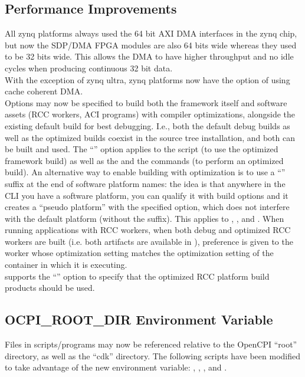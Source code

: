 \subsection{Performance Improvements}
\label{sec:21_perf}
All zynq platforms always used the 64 bit AXI DMA interfaces in the
zynq chip, but now the SDP/DMA FPGA modules are also 64 bits wide
whereas they used to be 32 bits wide.  This allows the DMA to have
higher throughput and no idle cycles when producing continuous 32 bit data.\\

With the exception of zynq ultra, zynq platforms now have the option of using cache coherent DMA.\\

Options may now be specified to build both the framework itself and software assets (RCC workers, ACI programs) with compiler optimizations, alongside the existing default build for best debugging.  I.e., both the default debug builds as well as the optimized builds coexist in the source tree installation, and both can be built and used.  The ``'' option applies to the  script (to use the optimized framework build) as well as the  and the  commands (to perform an optimized build).  An alternative way to enable building with optimization is to use a ``'' suffix at the end of software platform names: the idea is that anywhere in the CLI you have a software platform, you can qualify it with build options and it creates a ``pseudo platform'' with the specified option, which does not interfere with the default platform (without the suffix).  This applies to , , and .  When running applications with RCC workers, when both debug and optimized RCC workers are built (i.e. both artifacts are available in ), preference is given to the worker whose optimization setting matches the optimization setting of the container in which it is executing.\\

 supports the ``'' option to specify that the optimized RCC platform build products should be used.


\subsection{OCPI\_ROOT\_DIR Environment Variable}
\label{sec:21_rootdir}
Files in scripts/programs may now be referenced relative to the OpenCPI ``root'' directory, as well as the ``cdk'' directory.  The following scripts have been modified to take advantage of the new  environment variable: , , , and .


